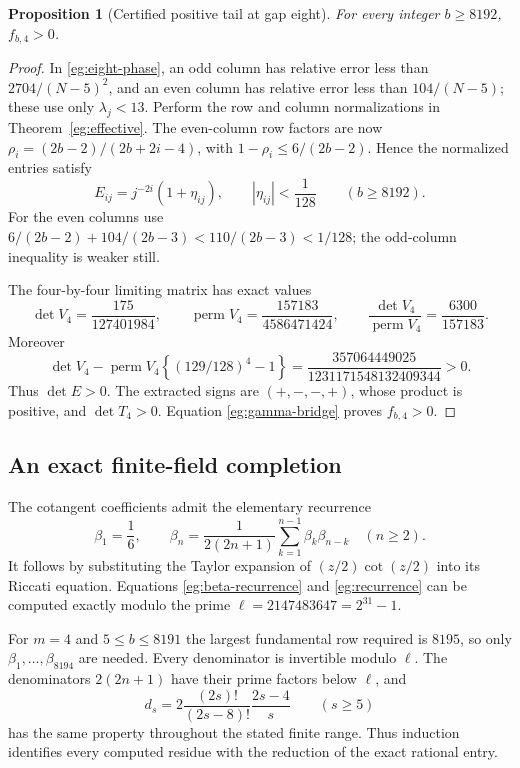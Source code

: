 \documentclass[11pt,a4paper]{article}
\numberwithin{equation}{section}
\newtheorem{proposition}[theorem]{Proposition}
\theoremstyle{definition}
\theoremstyle{remark}
\begin{document}
\begin{proposition}[Certified positive tail at gap eight]
\label{eg:eight-positive}
For every integer $b\ge8192$, $f_{b,4}>0$.
\end{proposition}

\begin{proof}
In \eqref{eg:eight-phase}, an odd column has relative error less
than $2704/(N-5)^2$, and an even column has relative error less
than $104/(N-5)$; these use only $\lambda_j<13$.
Perform the row and column normalizations in Theorem~\ref{eg:effective}.
The even-column row factors are now
$\rho_i=(2b-2)/(2b+2i-4)$, with
$1-\rho_i\le6/(2b-2)$.
Hence the normalized entries satisfy
\[
 E_{ij}=j^{-2i}(1+\eta_{ij}),\qquad
 |\eta_{ij}|<\frac1{128}\qquad(b\ge8192).
\]
For the even columns use
$6/(2b-2)+104/(2b-3)<110/(2b-3)<1/128$;
the odd-column inequality is weaker still.

The four-by-four limiting matrix has exact values
\[
 \det V_4=\frac{175}{127401984},\qquad
 \operatorname{perm}V_4=\frac{157183}{4586471424},\qquad
 \frac{\det V_4}{\operatorname{perm}V_4}=\frac{6300}{157183}.
\]
Moreover
\[
 \det V_4-\operatorname{perm}V_4
        \left\{(129/128)^4-1\right\}
       =\frac{357064449025}{1231171548132409344}>0.
\]
Thus $\det E>0$.  The extracted signs are $(+,-,-,+)$, whose
product is positive, and $\det T_4>0$.  Equation
\eqref{eg:gamma-bridge} proves $f_{b,4}>0$.
\end{proof}

\subsection{An exact finite-field completion}

The cotangent coefficients admit the elementary recurrence
\begin{equation}\label{eg:beta-recurrence}
 \beta_1=\frac16,\qquad
 \beta_n=\frac1{2(2n+1)}\sum_{k=1}^{n-1}\beta_k\beta_{n-k}
                  \quad(n\ge2).
\end{equation}
It follows by substituting the Taylor expansion of
$(z/2)\cot(z/2)$ into its Riccati equation.
Equations \eqref{eg:beta-recurrence} and \eqref{eg:recurrence}
can be computed exactly modulo the prime
$\ell=2147483647=2^{31}-1$.

For $m=4$ and $5\le b\le8191$ the largest fundamental row
required is $8195$, so only $\beta_1,\ldots,\beta_{8194}$ are needed.
Every denominator is invertible modulo $\ell$.  The denominators
$2(2n+1)$ have their prime factors below $\ell$, and
\begin{equation}\label{eg:diagonal-factorization}
 d_s=2\frac{(2s)!}{(2s-8)!}\frac{2s-4}{s}\qquad(s\ge5)
\end{equation}
has the same property throughout the stated finite range.  Thus
induction identifies every computed residue with the reduction of
the exact rational entry.
\end{document}

